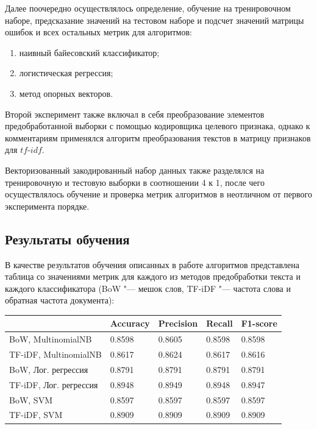 \documentclass[bachelor, och, coursework]{SCWorks}
\begin{document}
        Далее поочередно осуществлялось определение, обучение на тренировочном
        наборе, предсказание значений на тестовом наборе и подсчет значений
        матрицы ошибок и всех остальных метрик для алгоритмов:

        \begin{enumerate}
            \item наивный байесовский классификатор;
            \item логистическая регрессия;
            \item метод опорных векторов.
        \end{enumerate}

        Второй эксперимент также включал в себя преобразование элементов
        предобработанной выборки с помощью кодировщика целевого признака, однако
        к комментариям применялся алгоритм преобразования текстов в матрицу
        признаков для $tf \text{-} idf$.

        Векторизованный закодированный набор данных также разделялся на
        тренировочную и тестовую выборки в соотношении 4 к 1, после чего
        осуществлялось обучение и проверка метрик алгоритмов в неотличном от
        первого эксперимента порядке.

    \subsection{Результаты обучения}

        В качестве результатов обучения описанных в работе алгоритмов
        представлена таблица со значениями метрик для каждого из методов
        предобработки текста и каждого классификатора (BoW "--- мешок слов,
        TF-iDF "--- частота слова и обратная частота документа):

        \begin{table}[h]
            \begin{tabular}{|l|l|l|l|l|}
            \hline
                                                          & Accuracy & Precision & Recall & F1-score \\ \hline
            BoW, MultinomialNB & 0.8598   & 0.8605    & 0.8598 & 0.8598   \\ \hline
            TF-iDF, MultinomialNB     & 0.8617   & 0.8624    & 0.8617 & 0.8616   \\ \hline
            BoW, Лог. регрессия           & 0.8791   & 0.8791    & 0.8791 & 0.8791  \\ \hline
            TF-iDF, Лог. регрессия               & 0.8948   & 0.8949    & 0.8948 & 0.8947   \\ \hline
            BoW, SVM            & 0.8597   & 0.8597    & 0.8597 & 0.8597      \\ \hline
            TF-iDF, SVM                & 0.8909   & 0.8909    & 0.8909 & 0.8909   \\ \hline
            \end{tabular}
        \end{table}
\end{document}
